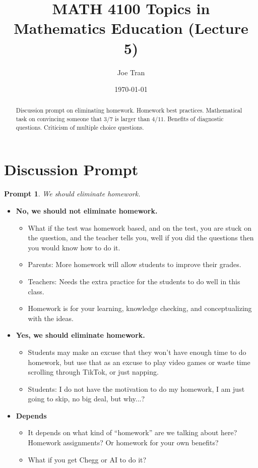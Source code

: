 \documentclass{amsart}
\title{MATH 4100 Topics in Mathematics Education (Lecture 5)}
\author{Joe Tran}
\date{\today}
\theoremstyle{theorem}\newtheorem{prompt}{Prompt}
\begin{document}
\maketitle

\begin{abstract}
    Discussion prompt on eliminating homework. Homework best practices. Mathematical task on convincing someone that $3/7$ is larger than $4/11$. Benefits of diagnostic questions. Criticism of multiple choice questions.
\end{abstract}

\section{Discussion Prompt}

\begin{prompt}
    We should eliminate homework.
\end{prompt}

\begin{itemize}
    \item \textbf{No, we should not eliminate homework.}
    \begin{itemize}
        \item What if the test was homework based, and on the test, you are stuck on the question, and the teacher tells you, well if you did the questions then you would know how to do it.
        \item Parents: More homework will allow students to improve their grades.
        \item Teachers: Needs the extra practice for the students to do well in this class.
        \item Homework is for your learning, knowledge checking, and conceptualizing with the ideas.
    \end{itemize}
    \item \textbf{Yes, we should eliminate homework.}
    \begin{itemize}
        \item Students may make an excuse that they won't have enough time to do homework, but use that as an excuse to play video games or waste time scrolling through TikTok, or just napping.
        \item Students: I do not have the motivation to do my homework, I am just going to skip, no big deal, but why...?
    \end{itemize}
    \item \textbf{Depends}
    \begin{itemize}
        \item It depends on what kind of “homework” are we talking about here? Homework assignments? Or homework for your own benefits?
        \item What if you get Chegg or AI to do it?
    \end{itemize}
\end{itemize}
\end{document}
